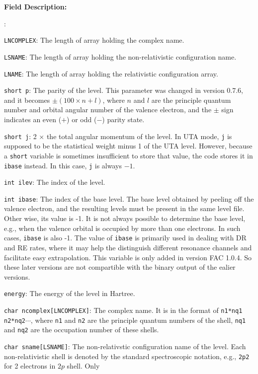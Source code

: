 \documentclass[twoside,letterpaper]{refrep}
\newenvironment{dbdesc}{\textbf{Field Description:} \begin{list}
	{:}{\setlength{\labelwidth}{2in}
	   \setlength{\leftmargin}{2in}
	   \setlength{\labelsep}{0.1in}
	   \setlength{\rightmargin}{0.2in}}}
	{\end{list}}
\begin{document}
\begin{dbdesc}
\item[\texttt{LNCOMPLEX}:] The length of array holding the complex name.
\item[\texttt{LSNAME}:] The length of array holding the non-relativistic
configuration name.
\item[\texttt{LNAME}:] The length of array holding the relativistic
configuration array.
\item[\texttt{short p}:] The parity of the level. This parameter was changed
in version 0.7.6, and it becomes $\pm(100\times n + l)$, where $n$ and $l$ are
the principle quantum number and orbital angular number of the valence
electron, and the $\pm$ sign indicates an even ($+$) or odd ($-$) parity state.
\item[\texttt{short j}:] 2 $\times$ the total angular momentum of the
  level. In UTA mode, \texttt{j} is supposed to be the statistical weight
  minus 1 of the UTA level. However, because a \texttt{short} variable is
  sometimes insufficient to store that value, the code stores it in
  \texttt{ibase} instead. In this case, \texttt{j} is always $-1$.
\item[\texttt{int ilev}:] The index of the level.
\item[\texttt{int ibase}:] The index of the base level. The base level
  obtained by peeling off the valence electron, and the resulting levels must
  be present in the same level file. Other wise, its value is -1. It is not
  always possible to determine the base level, e.g., when the valence orbital
  is occupied by more than one electrons. In such cases, \texttt{ibase} is
  also -1. The value of \texttt{ibase} is primarily used in dealing with DR
  and RE rates, where it may help the distinguish different resonance channels
  and facilitate easy extrapolation. This variable is only added in version
  FAC 1.0.4. So these later versions are not compartible with the binary
  output of the ealier versions.
\item[\texttt{energy}:] The energy of the level in Hartree.
\item[\texttt{char ncomplex[LNCOMPLEX]}:] The complex name. It is in the format
of \verb|n1*nq1 n2*nq2|$\cdots$, where \verb|n1| and \verb|n2| are the
principle quantum numbers of the shell, \verb|nq1| and \verb|nq2| are the
occupation number of these shells.
\item[\texttt{char sname[LSNAME]}:] The non-relativstic configuration name of
the level. Each non-relativistic shell is denoted by the standard
spectroscopic notation, e.g., \verb|2p2| for 2 electrons in $2p$ shell. Only

\end{dbdesc}
\end{document}
